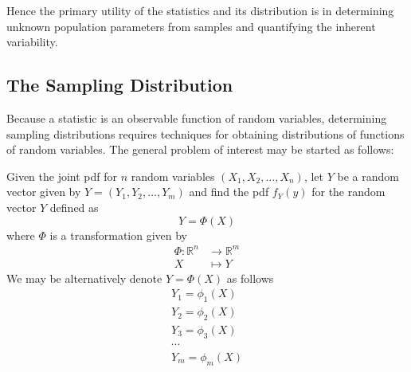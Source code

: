 \documentclass[twoside]{article}
\theoremstyle{definition}
\theoremstyle{remark}
\theoremstyle{remark}
\begin{document}
Hence the primary utility of the statistics and its distribution is in
determining unknown population parameters from samples and quantifying
the inherent variability.

\subsection{The Sampling Distribution}

Because a statistic is an observable function of random variables,
determining sampling
distributions requires techniques for obtaining distributions of functions
of random variables. The general problem of interest may be started as follows:


Given the joint pdf for $n$ random variables $(X_1, X_2, \ldots, X_n)$,
let $Y$ be a random vector given by $Y = (Y_1, Y_2, \ldots, Y_m)$ and find
the pdf $f_Y(y)$ for the random vector $Y$ defined as
\begin{equation*}
  Y = \Phi(X)
\end{equation*}
where $\Phi$ is a transformation given by
\begin{equation*}
  \begin{split}
    \Phi: \mathbb{R}^n &\rightarrow \mathbb{R}^m \\
                     X &\mapsto     Y
  \end{split}
\end{equation*}
We may be alternatively denote $Y = \Phi (X)$ as follows
\begin{equation*}
  \begin{gathered}
    Y_1 = \phi_1 (X) \\
    Y_2 = \phi_2 (X) \\
    Y_3 = \phi_3 (X) \\
    \cdots           \\
    Y_m = \phi_m (X) \\
  \end{gathered}
\end{equation*}
\end{document}
